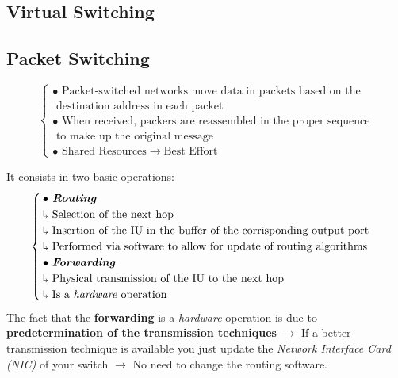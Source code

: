 \subsection{Virtual Switching}

\subsection{Packet Switching}
\begin{equation}
\begin{cases}
\bullet \text{ Packet-switched networks move data in packets based on the}\\ \text{ destination address in each packet} \\
\bullet \text{ When received, packers are reassembled in the proper sequence} \\ \text{ to make up the original message}\\
\bullet \text{ Shared Resources} \rightarrow \text{Best Effort}
\end{cases}
\end{equation}

It consists in two basic operations:
\begin{equation}
\begin{cases}
\bullet \text{\textit{ \textbf{Routing}}}\\ \rotatebox[origin=c]{180}{$\Lsh$} \text{ Selection of the next hop}\\ \rotatebox[origin=c]{180}{$\Lsh$} \text{ Insertion of the IU in the buffer of the corrisponding output port}\\
\rotatebox[origin=c]{180}{$\Lsh$} \text{ Performed via software to allow for update of routing algorithms}\\
\bullet \text{ \textit{\textbf{Forwarding}}}\\ \rotatebox[origin=c]{180}{$\Lsh$} \text{ Physical transmission of the IU to the next hop}
\\ \rotatebox[origin=c]{180}{$\Lsh$} \text{ Is a \textit{hardware} operation}
\end{cases}
\end{equation}
The fact that the \textbf{forwarding} is a \textit{hardware} operation is due to \textbf{predetermination of the transmission techniques} $\rightarrow$ If a better transmission technique is available you just update the \textit{Network Interface Card (NIC)} of your switch $\rightarrow$ No need to change the routing software.

